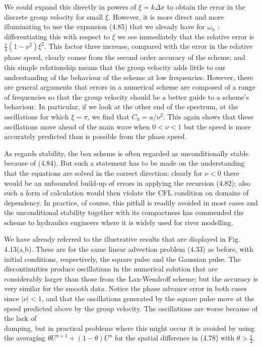 \documentclass[10pt]{article}
\begin{document}
We could expand this directly in powers of \(\xi=k \Delta x\) to obtain the error in the discrete group velocity for small \(\xi\). However, it is more direct and more illuminating to use the expansion (4.85) that we already have for \(\omega_{h}\) : differentiating this with respect to \(\xi\) we see immediately that the relative error is \(\frac{1}{4}\left(1-\nu^{2}\right) \xi^{2}\). This factor three increase, compared with the error in the relative phase speed, clearly comes from the second order accuracy of the scheme; and this simple relationship means that the group velocity adds little to our understanding of the behaviour of the scheme at low frequencies. However, there are general arguments that errors in a numerical scheme are composed of a range of frequencies so that the group velocity should be a better guide to a scheme's behaviour. In particular, if we look at the other end of the spectrum, at the oscillations for which \(\xi=\pi\), we find that \(C_{h}=a / \nu^{2}\). This again shows that these oscillations move ahead of the main wave when \(0<\nu<1\) but the speed is more accurately predicted than is possible from the phase speed.

As regards stability, the box scheme is often regarded as unconditionally stable because of (4.84). But such a statement has to be made on the understanding that the equations are solved in the correct direction: clearly for \(\nu<0\) there would be an unbounded build-up of errors in applying the recursion (4.82); also such a form of calculation would then violate the CFL condition on domains of dependency. In practice, of course, this pitfall is readily avoided in most cases and the unconditional stability together with its compactness has commended the scheme to hydraulics engineers where it is widely used for river modelling.

We have already referred to the illustrative results that are displayed in Fig. 4.13(a,b). These are for the same linear advection problem (4.33) as before, with initial conditions, respectively, the square pulse and the Gaussian pulse. The discontinuities produce oscillations in the numerical solution that are considerably larger than those from the Lax-Wendroff scheme; but the accuracy is very similar for the smooth data. Notice the phase advance error in both cases since \(|\nu|<1\), and that the oscillations generated by the square pulse move at the speed predicted above by the group velocity. The oscillations are worse because of the lack of\\
damping, but in practical problems where this might occur it is avoided by using the averaging \(\theta U^{n+1}+(1-\theta) U^{n}\) for the spatial difference in (4.78) with \(\theta>\frac{1}{2}\).
\end{document}
